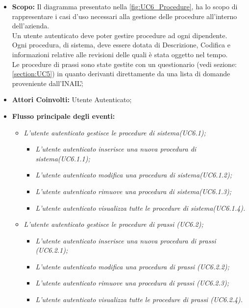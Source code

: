 			\begin{itemize}
				\item \textbf{Scopo:} Il diagramma presentato nella \autoref{fig:UC6_Procedure}, ha lo scopo di rappresentare i casi d'uso necessari alla gestione delle procedure all'interno dell'azienda. \\ 
				
				Un utente autenticato deve poter gestire procedure ad ogni dipendente. \\
				Ogni procedura, di sistema, deve essere dotata di Descrizione, Codifica e informazioni relative alle revisioni delle quali è stata oggetto nel tempo.\\
				Le procedure di prassi sono state gestite con un questionario (vedi sezione: \ref{section:UC5}) in quanto derivanti direttamente da una lista di domande proveniente dall'\gls{INAIL}\G;
				\item \textbf{Attori Coinvolti:} Utente Autenticato;
				\item \textbf{Flusso principale degli eventi:} 
				\begin{itemize}
					\item \textit{L'utente autenticato gestisce le procedure di sistema(UC6.1);}
					\begin{itemize}
						\item \textit{L'utente autenticato inserisce una nuova procedura di sistema(UC6.1.1);}
						\item \textit{L'utente autenticato modifica una procedura di sistema(UC6.1.2);}
						\item \textit{L'utente autenticato rimuove una procedura di sistema(UC6.1.3);}
						\item \textit{L'utente autenticato visualizza tutte le procedure di sistema(UC6.1.4).}
					\end{itemize}
					\item \textit{L'utente autenticato gestisce le procedure di prassi (UC6.2);}
					\begin{itemize}
						\item \textit{L'utente autenticato inserisce una nuova procedura di prassi (UC6.2.1);}
						\item \textit{L'utente autenticato modifica una procedura di prassi (UC6.2.2);}
						\item \textit{L'utente autenticato rimuove una procedura di prassi (UC6.2.3);}
						\item \textit{L'utente autenticato visualizza tutte le procedure di prassi (UC6.2.4).}
					\end{itemize}
				\end{itemize}
			\end{itemize}
			

